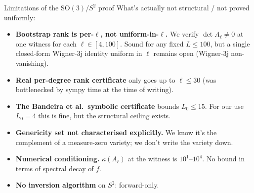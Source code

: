 \documentclass[10pt,aspectratio=169]{beamer}
\newcommand{\SO}{\mathrm{SO}}
\begin{document}
\begin{frame}{Limitations of the $\SO(3)$/$S^2$ proof}
What's actually \alert{not} structural / not proved uniformly:
\begin{itemize}
  \item \textbf{Bootstrap rank is per-$\ell$, not uniform-in-$\ell$.}
        We verify $\det A_\ell \ne 0$ at one witness for each $\ell \in [4,100]$.
        Sound for any fixed $L \le 100$, but a single closed-form Wigner-3j
        identity uniform in $\ell$ remains open (Wigner-3j non-vanishing).
  \item \textbf{Real per-degree rank certificate} only goes up to $\ell \le 30$
        (was bottlenecked by sympy time at the time of writing).
  \item \textbf{The Bandeira et al.\ symbolic certificate} bounds $L_0 \le 15$.
        For our use $L_0 = 4$ this is fine, but the structural ceiling exists.
  \item \textbf{Genericity set not characterised explicitly.}
        We know it's the complement of a measure-zero variety; we don't
        write the variety down.
  \item \textbf{Numerical conditioning.}
        $\kappa(A_\ell)$ at the witness is $10^1$--$10^4$. No bound in terms
        of spectral decay of $f$.
  \item \textbf{No inversion algorithm} on $S^2$: forward-only.
\end{itemize}
\end{frame}
\end{document}
